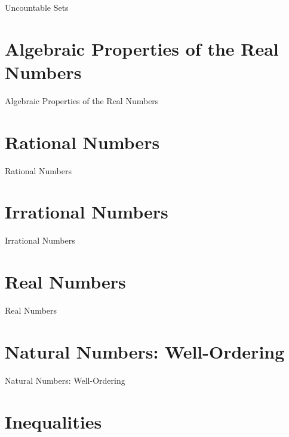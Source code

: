Uncountable Sets

\section{Algebraic Properties of the Real Numbers}
\label{sec:algebraic-properties-of-the-real-numbers}

Algebraic Properties of the Real Numbers

\section{Rational Numbers}
\label{sec:rational-numbers}

Rational Numbers

\section{Irrational Numbers}
\label{sec:irrational-numbers}

Irrational Numbers

\section{Real Numbers}
\label{sec:real-numbers}

Real Numbers

\section{Natural Numbers: Well-Ordering}
\label{sec:natural-numbers-well-ordering}

Natural Numbers: Well-Ordering

\section{Inequalities}
\label{sec:inequalities}


